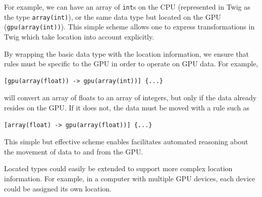 For example, we can have an array of \texttt{int}s on the CPU (represented in
Twig as the type \texttt{array(int)}), or the same data type but located on the
GPU (\texttt{gpu(array(int))}). This simple scheme allows one to express
transformations in Twig which take location into account explicitly.

By wrapping the basic data type with the location information, we ensure that
rules must be specific to the GPU in order to operate on GPU data. For example,

\begin{verbatim}
[gpu(array(float)) -> gpu(array(int))] {...}
\end{verbatim}

will convert an array of floats to an array of integers, but only if the data
already resides on the GPU. If it does not, the data must be moved with a rule
such as

\begin{verbatim}
[array(float) -> gpu(array(float))] {...}
\end{verbatim}

This simple but effective scheme enables facilitates automated reasoning about
the movement of data to and from the GPU.

Located types could easily be extended to support more complex location
information. For example, in a computer with multiple GPU devices, each device
could be assigned its own location.
